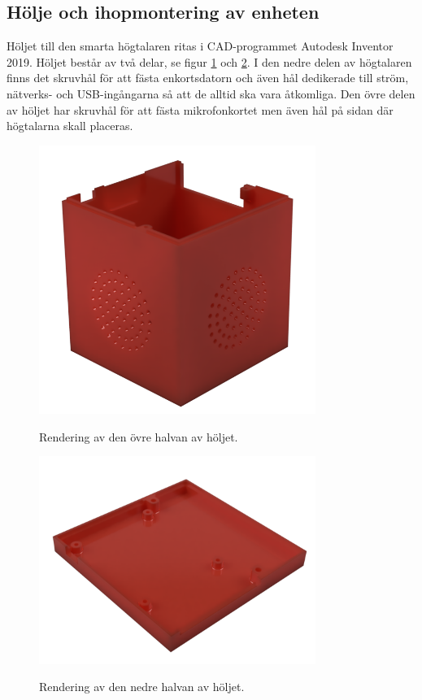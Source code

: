 \subsection{Hölje och ihopmontering av enheten}
Höljet till den smarta högtalaren ritas i CAD-programmet Autodesk Inventor 2019. Höljet består av två delar, se figur \ref{fig:top-3d} och \ref{fig:bottom-3d}. I den nedre delen av högtalaren finns det skruvhål för att fästa enkortsdatorn och även hål dedikerade till ström, nätverks- och USB-ingångarna så att de alltid ska vara åtkomliga. Den övre delen av höljet har skruvhål för att fästa mikrofonkortet men även hål på sidan där högtalarna skall placeras. 
\begin{figure}[H]
    \centering
    \caption{\small Rendering av den övre halvan av höljet.}
    \includegraphics[width=9cm]{bilder/top_red.png}
    \label{fig:top-3d} 
\end{figure}

\begin{figure}[H]
    \centering
    \caption{\small Rendering av den nedre halvan av höljet.}
    \includegraphics[width=9cm]{bilder/bottom_red.png}
    \label{fig:bottom-3d} 
\end{figure}

